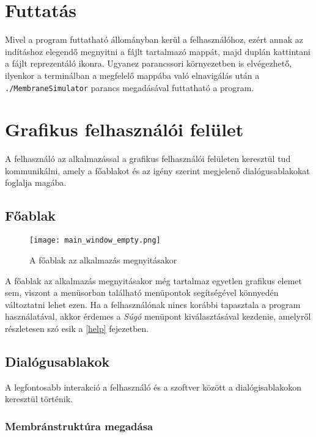 \section{Futtatás}

Mivel a program futtatható állományban kerül a felhasználóhoz, ezért annak az indításhoz elegendő megnyitni a fájlt tartalmazó mappát, majd duplán kattintani a fájlt reprezentáló ikonra. Ugyanez parancssori környezetben is elvégezhető, ilyenkor a terminálban a megfelelő mappába való elnavigálás után a 
\verb|./MembraneSimulator| parancs megadásával futtatható a program.

\section{Grafikus felhasználói felület}

A felhasználó az alkalmazással a grafikus felhasználói felületen keresztül tud kommunikálni, amely a főablakot és az igény szerint megjelenő dialógusablakokat foglalja magába.

\subsection{Főablak}

\begin{figure}[H]
	\centering
	\texttt{[image: main\_window\_empty.png]}
	\caption{A főablak az alkalmazás megnyitásakor}
	\label{fig:main_window}
\end{figure}

A főablak az alkalmazás megnyitásakor még tartalmaz egyetlen grafikus elemet sem, viszont a menüsorban található menüpontok segítségével könnyedén változtatni lehet ezen. Ha a felhasználónak nincs korábbi tapasztala a program használatával, akkor érdemes a \textit{Súgó} menüpont kiválasztásával kezdenie, amelyről részletesen szó esik a \ref{help} fejezetben.

\subsection{Dialógusablakok}

A legfontosabb interakció a felhasználó és a szoftver között a dialógisablakokon keresztül történik.  

\subsubsection{Membránstruktúra megadása}\label{create_structure}

